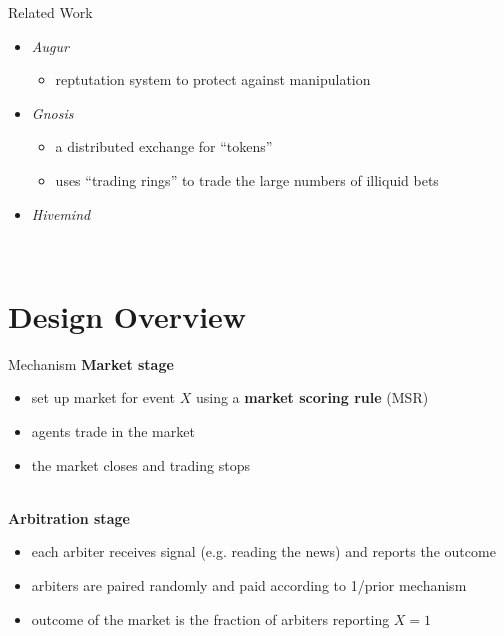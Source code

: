 \documentclass[9pt]{beamer}
\begin{document}
\begin{frame}{Related Work}
    \begin{itemize}
        \item<2-> \emph{Augur}
        \begin{itemize}
            \item reptutation system to protect against manipulation
        \end{itemize}
        \item<3-> \emph{Gnosis}
        \begin{itemize}
            \item a distributed exchange for ``tokens''
            \item uses ``trading rings'' to trade the large numbers of illiquid bets
        \end{itemize}
        \item<4-> \emph{Hivemind}
    \end{itemize}~\\
    
\end{frame}

\section{Design Overview}

\begin{frame}{Mechanism}
    \textbf{Market stage}
    \begin{itemize}
        \item set up market for event $X$ using a \textbf{market scoring rule} (MSR)
        \item agents trade in the market
        \item the market closes and trading stops
    \end{itemize}~\\
    
    \textbf{Arbitration stage}
    \begin{itemize}
        \item each arbiter receives signal (e.g. reading the news) and reports the outcome
        \item arbiters are paired randomly and paid according to 1/prior mechanism
        \item outcome of the market is the fraction of arbiters reporting $X=1$
    \end{itemize}
\end{frame}
\end{document}
